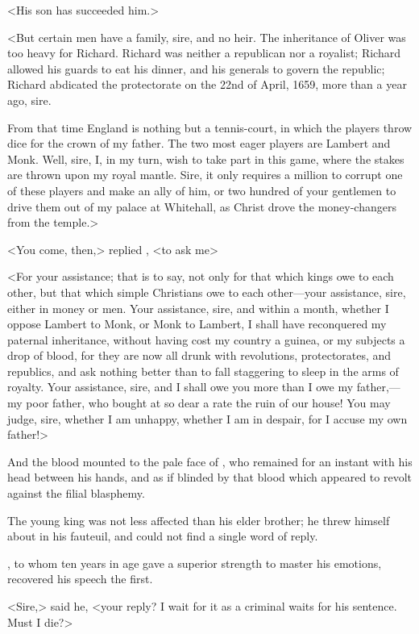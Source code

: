 <His son has succeeded him.>

<But certain men have a family, sire, and no heir. The inheritance of Oliver was too heavy for Richard. Richard was neither a republican nor a royalist; Richard allowed his guards to eat his dinner, and his generals to govern the republic; Richard abdicated the protectorate on the 22nd of April, 1659, more than a year ago, sire.

From that time England is nothing but a tennis-court, in which the players throw dice for the crown of my father. The two most eager players are Lambert and Monk. Well, sire, I, in my turn, wish to take part in this game, where the stakes are thrown upon my royal mantle. Sire, it only requires a million to corrupt one of these players and make an ally of him, or two hundred of your gentlemen to drive them out of my palace at Whitehall, as Christ drove the money-changers from the temple.>

<You come, then,> replied , <to ask me\longdash>

<For your assistance; that is to say, not only for that which kings owe to each other, but that which simple Christians owe to each other—your assistance, sire, either in money or men. Your assistance, sire, and within a month, whether I oppose Lambert to Monk, or Monk to Lambert, I shall have reconquered my paternal inheritance, without having cost my country a guinea, or my subjects a drop of blood, for they are now all drunk with revolutions, protectorates, and republics, and ask nothing better than to fall staggering to sleep in the arms of royalty. Your assistance, sire, and I shall owe you more than I owe my father,—my poor father, who bought at so dear a rate the ruin of our house! You may judge, sire, whether I am unhappy, whether I am in despair, for I accuse my own father!>

And the blood mounted to the pale face of , who remained for an instant with his head between his hands, and as if blinded by that blood which appeared to revolt against the filial blasphemy.

The young king was not less affected than his elder brother; he threw himself about in his fauteuil, and could not find a single word of reply.

, to whom ten years in age gave a superior strength to master his emotions, recovered his speech the first.

<Sire,> said he, <your reply? I wait for it as a criminal waits for his sentence. Must I die?>

